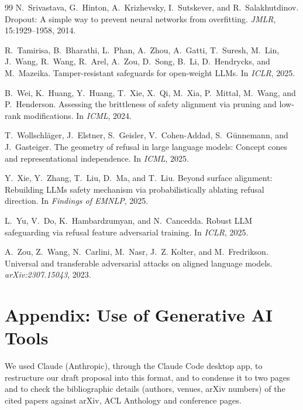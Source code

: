 \documentclass[12pt]{article}
\begin{document}
\begin{thebibliography}{99}
N.~Srivastava, G.~Hinton, A.~Krizhevsky, I.~Sutskever, and R.~Salakhutdinov.
\newblock Dropout: A simple way to prevent neural networks from overfitting.
\newblock \emph{JMLR}, 15:1929--1958, 2014.

R.~Tamirisa, B.~Bharathi, L.~Phan, A.~Zhou, A.~Gatti, T.~Suresh, M.~Lin, J.~Wang, R.~Wang, R.~Arel, A.~Zou, D.~Song, B.~Li, D.~Hendrycks, and M.~Mazeika.
\newblock Tamper-resistant safeguards for open-weight LLMs.
\newblock In \emph{ICLR}, 2025.

B.~Wei, K.~Huang, Y.~Huang, T.~Xie, X.~Qi, M.~Xia, P.~Mittal, M.~Wang, and P.~Henderson.
\newblock Assessing the brittleness of safety alignment via pruning and low-rank modifications.
\newblock In \emph{ICML}, 2024.

T.~Wollschl{\"a}ger, J.~Elstner, S.~Geisler, V.~Cohen-Addad, S.~G{\"u}nnemann, and J.~Gasteiger.
\newblock The geometry of refusal in large language models: Concept cones and representational independence.
\newblock In \emph{ICML}, 2025.

Y.~Xie, Y.~Zhang, T.~Liu, D.~Ma, and T.~Liu.
\newblock Beyond surface alignment: Rebuilding LLMs safety mechanism via probabilistically ablating refusal direction.
\newblock In \emph{Findings of EMNLP}, 2025.

L.~Yu, V.~Do, K.~Hambardzumyan, and N.~Cancedda.
\newblock Robust LLM safeguarding via refusal feature adversarial training.
\newblock In \emph{ICLR}, 2025.

A.~Zou, Z.~Wang, N.~Carlini, M.~Nasr, J.~Z. Kolter, and M.~Fredrikson.
\newblock Universal and transferable adversarial attacks on aligned language models.
\newblock \emph{arXiv:2307.15043}, 2023.

\end{thebibliography}
\endgroup

\appendix
\section*{Appendix: Use of Generative AI Tools}
We used Claude (Anthropic), through the Claude Code desktop app, to restructure our draft proposal into this format, and to condense it to two pages and to check the bibliographic details (authors, venues, arXiv numbers) of the cited papers against arXiv, ACL Anthology and conference pages.
\end{document}
